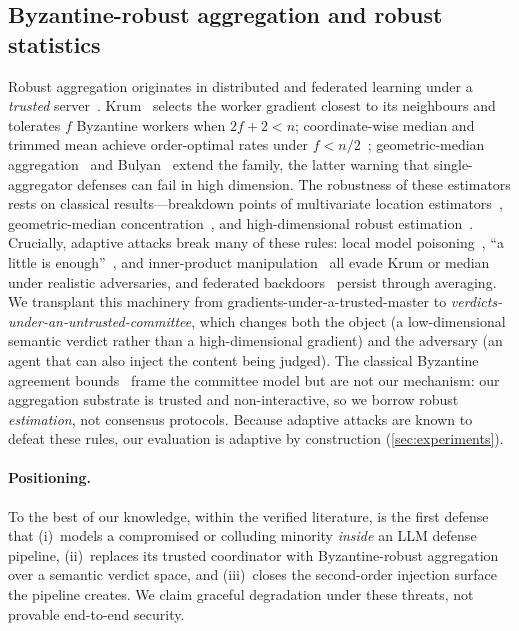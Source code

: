 \subsection{Byzantine-robust aggregation and robust statistics}
Robust aggregation originates in distributed and federated learning under a
\emph{trusted} server~\cite{mcmahan2017fedavg}. Krum~\cite{blanchard2017krum} selects the worker gradient closest
to its neighbours and tolerates $f$ Byzantine workers when $2f{+}2<n$; coordinate-wise
median and trimmed mean achieve order-optimal rates under $f<n/2$~\cite{yin2018byzantine};
geometric-median aggregation~\cite{chen2017byzantine,pillutla2022rfa} and
Bulyan~\cite{mhamdi2018bulyan} extend the family, the latter warning that
single-aggregator defenses can fail in high dimension. The robustness of these estimators
rests on classical results—breakdown points of multivariate location
estimators~\cite{lopuhaa1991breakdown}, geometric-median concentration~\cite{minsker2015geometric},
and high-dimensional robust estimation~\cite{diakonikolas2016robust,lai2016agnostic,diakonikolas2019recent}.
Crucially, adaptive attacks break many of these rules: local model
poisoning~\cite{fang2020poisoning}, ``a little is enough''~\cite{baruch2019little}, and
inner-product manipulation~\cite{xie2019fall} all evade Krum or median under realistic
adversaries, and federated backdoors~\cite{bagdasaryan2020backdoor} persist through
averaging. We transplant this machinery from gradients-under-a-trusted-master to
\emph{verdicts-under-an-untrusted-committee}, which changes both the object (a
low-dimensional semantic verdict rather than a high-dimensional gradient) and the
adversary (an agent that can also inject the content being judged). The classical
Byzantine agreement bounds~\cite{lamport1982byzantine,castro1999pbft} frame the committee
model but are not our mechanism: our aggregation substrate is trusted and non-interactive,
so we borrow robust \emph{estimation}, not consensus protocols. Because adaptive attacks
are known to defeat these rules, our evaluation is adaptive by construction
(\cref{sec:experiments}).

\paragraph{Positioning.}
To the best of our knowledge, within the verified literature, \Aegis is the first defense
that (i)~models a compromised or colluding minority \emph{inside} an LLM defense pipeline,
(ii)~replaces its trusted coordinator with Byzantine-robust aggregation over a semantic
verdict space, and (iii)~closes the second-order injection surface the pipeline creates.
We claim graceful degradation under these threats, not provable end-to-end security.
